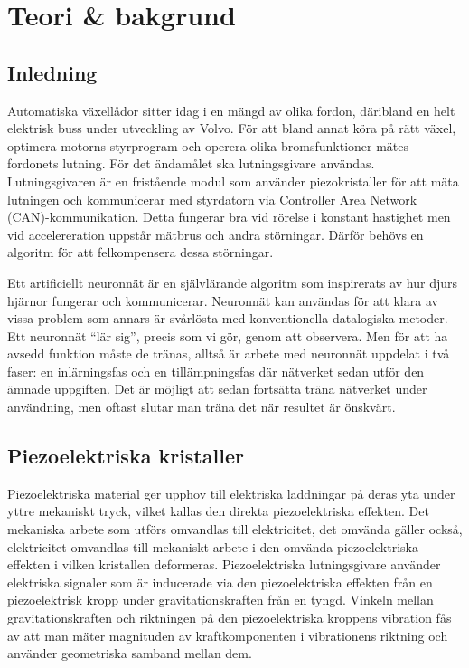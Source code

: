 \section{Teori \& bakgrund}
\subsection{Inledning}
Automatiska växellådor sitter idag i en mängd av olika fordon,
däribland en helt elektrisk buss under utveckling av Volvo.
För att bland annat köra på rätt växel, optimera motorns styrprogram
och operera olika bromsfunktioner %
mätes fordonets lutning.
För det ändamålet ska lutningsgivare användas.
Lutningsgivaren är en fristående modul som använder piezokristaller för att
mäta lutningen och kommunicerar med styrdatorn via
Controller Area Network (CAN)-kommunikation.
Detta fungerar bra vid rörelse i konstant hastighet
men vid accelereration uppstår mätbrus och andra störningar.
Därför behövs en algoritm för att felkompensera dessa störningar.

Ett artificiellt neuronnät är en självlärande algoritm som inspirerats av
hur djurs hjärnor fungerar och kommunicerar.
Neuronnät kan användas för att klara av vissa problem som annars är svårlösta
med konventionella datalogiska metoder.
Ett neuronnät ``lär sig'', precis som vi gör, genom att observera.
Men för att ha avsedd funktion måste de tränas, alltså är arbete med neuronnät
uppdelat i två faser: en inlärningsfas och en tillämpningsfas där nätverket sedan
utför den ämnade uppgiften.
\autocite{copeland16}
Det är möjligt att sedan fortsätta träna nätverket
under användning, men oftast slutar man träna det när resultet är önskvärt.
\autocite{wiki-neuronnat}

\subsection{Piezoelektriska kristaller}
Piezoelektriska material ger upphov till
elektriska laddningar på deras yta under yttre mekaniskt tryck,
vilket kallas den direkta piezoelektriska effekten.
Det mekaniska arbete som utförs omvandlas till elektricitet, det omvända gäller
också, elektricitet omvandlas till mekaniskt arbete i den omvända
piezoelektriska effekten i vilken kristallen deformeras.
\autocite{electronicdesign2016}
Piezoelektriska lutningsgivare använder elektriska signaler som är
inducerade via den piezoelektriska effekten från en piezoelektrisk kropp
under gravitationskraften från en tyngd.
Vinkeln mellan gravitationskraften och
riktningen på den piezoelektriska kroppens vibration
fås av att man mäter magnituden av kraftkomponenten i vibrationens riktning
och använder geometriska samband mellan dem.
\autocite{chiang00}

